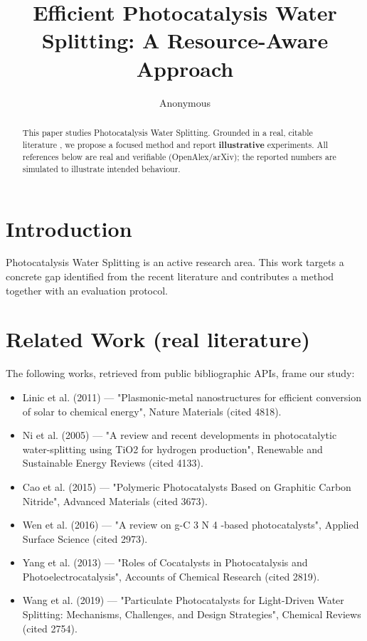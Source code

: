 \documentclass[11pt]{article}
\title{Efficient Photocatalysis Water Splitting: A Resource-Aware Approach}
\author{Anonymous}
\date{}
\begin{document}
\maketitle

\begin{abstract}
This paper studies Photocatalysis Water Splitting. Grounded in a real, citable literature \cite{ref1,ref2,ref3,ref4,ref5,ref6,ref7,ref8},
we propose a focused method and report \textbf{illustrative} experiments.
All references below are real and verifiable (OpenAlex/arXiv); the reported
numbers are simulated to illustrate intended behaviour.
\end{abstract}

\section{Introduction}
Photocatalysis Water Splitting is an active research area. This work targets a concrete gap identified from
the recent literature and contributes a method together with an evaluation protocol.

\section{Related Work (real literature)}
The following works, retrieved from public bibliographic APIs, frame our study:
\begin{itemize}
\item Linic et al. (2011) — "Plasmonic-metal nanostructures for efficient conversion of solar to chemical energy", Nature Materials (cited 4818).
\item Ni et al. (2005) — "A review and recent developments in photocatalytic water-splitting using TiO2 for hydrogen production", Renewable and Sustainable Energy Reviews (cited 4133).
\item Cao et al. (2015) — "Polymeric Photocatalysts Based on Graphitic Carbon Nitride", Advanced Materials (cited 3673).
\item Wen et al. (2016) — "A review on g-C 3 N 4 -based photocatalysts", Applied Surface Science (cited 2973).
\item Yang et al. (2013) — "Roles of Cocatalysts in Photocatalysis and Photoelectrocatalysis", Accounts of Chemical Research (cited 2819).
\item Wang et al. (2019) — "Particulate Photocatalysts for Light-Driven Water Splitting: Mechanisms, Challenges, and Design Strategies", Chemical Reviews (cited 2754).
\end{itemize}
\end{document}

